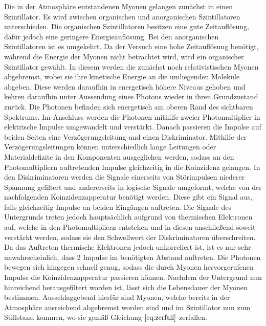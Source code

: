  Die in der Atmosphäre entstandenen Myonen gelangen zunächst in einen Szintillator. Es wird zwischen organischen und anorganischen Szintillatoren unterschieden. Die organischen Szintillatoren besitzen eine gute Zeitauflösung, dafür jedoch eine geringere Energieauflösung. Bei den anorganischen Szintillatoren ist es umgekehrt. Da der Versuch eine hohe Zeitauflösung benötigt, während die Energie der Myonen nicht betrachtet wird, wird ein organischer Szintillator gewählt. In diesem werden die zunächst noch relativistischen Myonen abgebremst, wobei sie ihre kinetische Energie an die umliegenden Moleküle abgeben. Diese werden daraufhin in energetisch höhere Niveaus gehoben und kehren daraufhin unter Aussendung eines Photons wieder in ihren Grundzustand zurück. Die Photonen befinden sich energetisch am oberen Rand des sichtbaren Spektrums. Im Anschluss werden die Photonen mithilfe zweier Photomultiplier in elektrische Impulse umgewandelt und verstärkt.
   Danach passieren die Impulse auf beiden Seiten eine Verzögerungsleitung und einen Diskriminator. Mithilfe der Verzögerungsleitungen können unterschiedlich lange Leitungen oder Materialdefizite in den Komponenten ausgeglichen werden, sodass an den Photomultipliern auftretenden Impulse gleichzeitig in die Koinzidenz gelangen. In den Diskriminatoren werden die Signale einerseits von Störimpulsen niederer Spannung gefiltert und andererseits in logische Signale umgeformt, welche von der nachfolgenden Koinzidenzapperatur benötigt werden.
     Diese gibt ein Signal aus, falls gleichzeitig Impulse an beiden Eingängen auftreten. Die Signale des Untergrunds treten jedoch hauptsächlich aufgrund von thermischen Elektronen auf, welche in den Photomultipliern entstehen und in diesen anschließend soweit verstärkt werden, sodass sie den Schwellwert der Diskriminatoren überschreiten. Da das Auftreten thermische Elektronen jedoch unkorreliert ist, ist es nur sehr unwahrscheinlich, dass 2 Impulse im benötigten
     Abstand auftreten. Die Photonen bewegen sich hingegen schnell genug, sodass die durch Myonen hervorgerufenen Impulse die Koinzidenzapperatur passieren können.
   Nachdem der Untergrund nun hinreichend herausgefiltert worden ist, lässt sich die Lebensdauer der Myonen bestimmen. Ausschlaggebend hierfür sind Myonen, welche bereits in der Atmosphäre ausreichend abgebremst worden sind und im Szintillator nun zum Stillstand kommen, wo sie gemäß Gleichung $\eqref{eq:zerfall}$ zerfallen.
